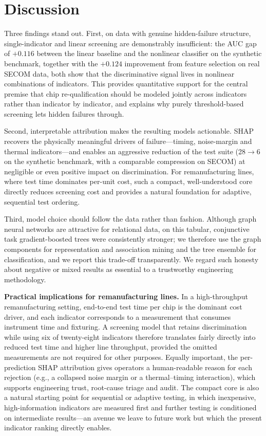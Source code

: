 \documentclass[electronics,article,submit,pdftex,moreauthors]{Definitions/mdpi}
\begin{document}
\section{Discussion}
Three findings stand out. First, on data with genuine hidden-failure structure, single-indicator and linear screening are demonstrably insufficient: the AUC gap of $+0.116$ between the linear baseline and the nonlinear classifier on the synthetic benchmark, together with the $+0.124$ improvement from feature selection on real SECOM data, both show that the discriminative signal lives in nonlinear combinations of indicators. This provides quantitative support for the central premise that chip re-qualification should be modeled jointly across indicators rather than indicator by indicator, and explains why purely threshold-based screening lets hidden failures through.

Second, interpretable attribution makes the resulting models actionable. SHAP recovers the physically meaningful drivers of failure---timing, noise-margin and thermal indicators---and enables an aggressive reduction of the test suite (28$\rightarrow$6 on the synthetic benchmark, with a comparable compression on SECOM) at negligible or even positive impact on discrimination. For remanufacturing lines, where test time dominates per-unit cost, such a compact, well-understood core directly reduces screening cost and provides a natural foundation for adaptive, sequential test ordering.

Third, model choice should follow the data rather than fashion. Although graph neural networks are attractive for relational data, on this tabular, conjunctive task gradient-boosted trees were consistently stronger; we therefore use the graph components for representation and association mining and the tree ensemble for classification, and we report this trade-off transparently. We regard such honesty about negative or mixed results as essential to a trustworthy engineering methodology.

\textbf{Practical implications for remanufacturing lines.} In a high-throughput remanufacturing setting, end-to-end test time per chip is the dominant cost driver, and each indicator corresponds to a measurement that consumes instrument time and fixturing. A screening model that retains discrimination while using six of twenty-eight indicators therefore translates fairly directly into reduced test time and higher line throughput, provided the omitted measurements are not required for other purposes. Equally important, the per-prediction SHAP attribution gives operators a human-readable reason for each rejection (e.g., a collapsed noise margin or a thermal--timing interaction), which supports engineering trust, root-cause triage and audit. The compact core is also a natural starting point for sequential or adaptive testing, in which inexpensive, high-information indicators are measured first and further testing is conditioned on intermediate results---an avenue we leave to future work but which the present indicator ranking directly enables.
\end{document}
